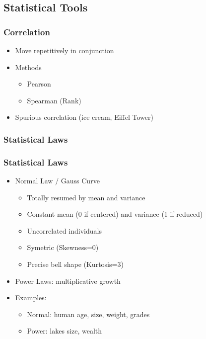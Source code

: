 \subsection{Statistical Tools}


\begin{frame}\frametitle{Correlation}
   \begin{itemize}
      \item Move repetitively in conjunction
      \item Methods
      \begin{itemize}
         \item Pearson
         \item Spearman (Rank)
      \end{itemize}
      \item Spurious correlation (ice cream, Eiffel Tower)
   \end{itemize}
\end{frame}



\subsubsection{Statistical Laws}

\begin{frame}\frametitle{Statistical Laws}
   \begin{itemize}
      \item Normal Law / Gauss Curve
      \begin{itemize}
         \item Totally resumed by mean and variance
         \item Constant mean (0 if centered) and variance (1 if reduced)
         \item Uncorrelated individuals
         \item Symetric (Skewness=0)
         \item Precise bell shape (Kurtosis=3)
      \end{itemize}

      \item Power Laws: multiplicative growth
      \item Examples:
      \begin{itemize}
         \item Normal: human age, size, weight, grades
         \item Power: lakes size, wealth
      \end{itemize}
   \end{itemize}
\end{frame}



